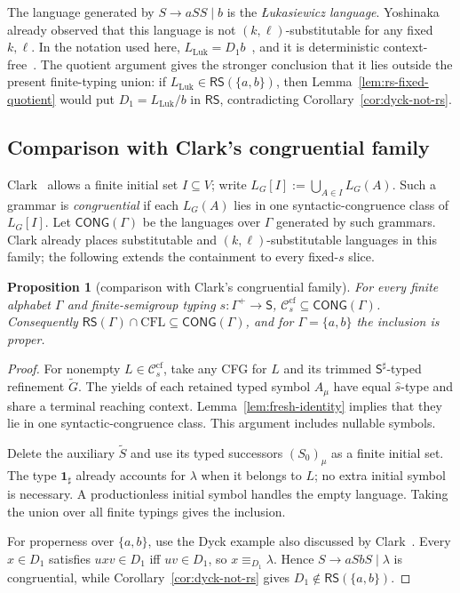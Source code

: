 \documentclass[11pt,a4paper]{article}
\newtheorem{proposition}[theorem]{Proposition}
\theoremstyle{remark}
\theoremstyle{plain}
\newcommand{\cf}{\mathrm{cf}}
\newcommand{\Ccf}[1]{\mathcal C_{#1}^{\cf}}
\begin{document}
The language generated by $S\to aSS\mid b$ is the
\emph{{\selectfont\L{}}ukasiewicz language}.
Yoshinaka~\cite[Section~3]{yoshinaka2008} already observed that this language
is not $(k,\ell)$-substitutable for any fixed $k,\ell$.  In the notation used
here, $L_{\mathrm{Luk}}=D_1b$~\cite{autebert1997}, and it is deterministic
context-free~\cite{ginsburg-greibach1966}.  The quotient argument gives the
stronger conclusion that it lies outside the present finite-typing union: if
$L_{\mathrm{Luk}}\in\mathsf{RS}(\{a,b\})$, then
Lemma~\ref{lem:rs-fixed-quotient} would put
$D_1=L_{\mathrm{Luk}}/b$ in $\mathsf{RS}$, contradicting
Corollary~\ref{cor:dyck-not-rs}.

\subsection{Comparison with Clark's congruential family}

Clark~\cite{clark2010congruential} allows a finite initial set
$I\subseteq V$; write $L_G[I]:=\bigcup_{A\in I}L_G(A)$.  Such a grammar is
\emph{congruential} if each $L_G(A)$ lies in one syntactic-congruence class
of $L_G[I]$.  Let $\mathsf{CONG}(\Gamma)$ be the languages over $\Gamma$
generated by such grammars.  Clark already places substitutable and
$(k,\ell)$-substitutable languages in this family; the following extends
the containment to every fixed-$s$ slice.

\begin{proposition}[comparison with Clark's congruential family]
\label{prop:clark-congruential-comparison}
For every finite alphabet $\Gamma$ and finite-semigroup typing
$s:\Gamma^+\to\mathsf S$,
$\Ccf{s}\subseteq\mathsf{CONG}(\Gamma)$.  Consequently
$\mathsf{RS}(\Gamma)\cap\mathrm{CFL}
\subseteq\mathsf{CONG}(\Gamma)$, and for $\Gamma=\{a,b\}$ the
inclusion is proper.
\end{proposition}

\begin{proof}
For nonempty $L\in\Ccf{s}$, take any CFG for $L$
and its trimmed $\mathsf S^\sharp$-typed refinement $\widetilde G$.
The yields of each retained typed symbol $A_\mu$
have equal $\widehat s$-type and share a terminal reaching
context.  Lemma~\ref{lem:fresh-identity} implies
that they lie in one syntactic-congruence class.
This argument includes nullable symbols.

Delete the auxiliary $\widetilde S$ and use its
typed successors $(S_0)_\mu$ as a finite initial set.
The type $\mathbf{1}_{\sharp}$ already accounts for $\lambda$
when it belongs to $L$; no extra initial symbol
is necessary.  A productionless initial symbol
handles the empty language.  Taking the union
over all finite typings gives the inclusion.

For properness over $\{a,b\}$, use the Dyck example also discussed by
Clark~\cite{clark2010congruential}.  Every $x\in D_1$ satisfies
$uxv\in D_1$ iff $uv\in D_1$, so $x\equiv_{D_1}\lambda$.  Hence
$S\to aSbS\mid\lambda$ is congruential, while
Corollary~\ref{cor:dyck-not-rs} gives
$D_1\notin\mathsf{RS}(\{a,b\})$.
\end{proof}
\end{document}

